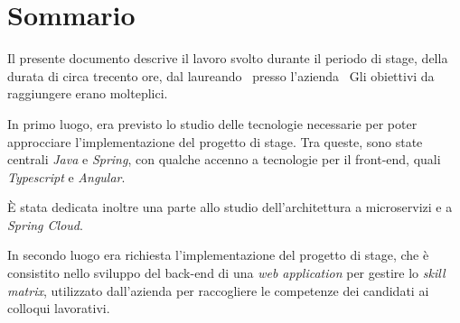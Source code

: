 
\cleardoublepage
{}
{}
\begingroup
\let\clearpage\relax
\let\cleardoublepage\relax
\let\cleardoublepage\relax

\chapter*{Sommario}

Il presente documento descrive il lavoro svolto durante il periodo di stage, della durata di circa trecento ore, dal laureando \myName\ presso l'azienda \myCompany\
Gli obiettivi da raggiungere erano molteplici.

In primo luogo, era previsto lo studio delle tecnologie necessarie per poter approcciare l'implementazione del progetto di stage. Tra queste, sono state centrali
\textit{Java} e \textit{Spring}, con qualche accenno a tecnologie per il front-end, quali \textit{Typescript} e \textit{Angular}.

\noindent È stata dedicata inoltre una parte allo studio dell'architettura a microservizi e a \textit{Spring Cloud}.

In secondo luogo era richiesta l'implementazione del progetto di stage, che è consistito nello sviluppo del back-end di una \textit{web application} per gestire lo \textit{skill matrix}, utilizzato dall'azienda per raccogliere le competenze dei candidati ai colloqui lavorativi.

%
%

\endgroup

\vfill
